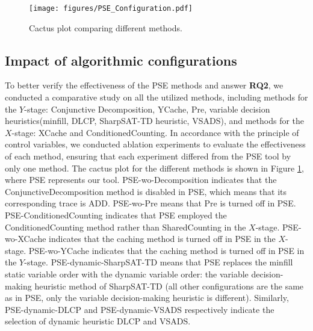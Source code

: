 \begin{figure}[h]
	\centering
	\texttt{[image: figures/PSE\_Configuration.pdf]}
	\caption{Cactus plot comparing different methods.}
	\label{figure:3}
\end{figure} 




\subsection{Impact of algorithmic configurations}
To better verify the effectiveness of the PSE methods and answer \textbf{RQ2}, we conducted a comparative study on all the utilized methods, including methods for the $Y$-stage: \textsf{Conjunctive Decomposition}, \textsf{YCache}, \textsf{Pre}, variable decision heuristics(\textsf{minfill}, \textsf{DLCP}, \textsf{SharpSAT-TD heuristic}, \textsf{VSADS}), and methods for the $X$-stage: \textsf{XCache} and \textsf{ConditionedCounting}.
In accordance with the principle of control variables, we conducted ablation experiments to evaluate the effectiveness of each method, ensuring that each experiment differed from the PSE tool by only one method.
The cactus plot for the different methods is shown in Figure \ref{figure:3}, where PSE represents our tool. 
PSE-wo-Decomposition indicates that the \textsf{ConjunctiveDecomposition} method is disabled in PSE, which means that its corresponding trace is ADD.
PSE-wo-Pre means that \textsf{Pre} is turned off in PSE.
PSE-ConditionedCounting indicates that PSE employed the \textsf{ConditionedCounting} method rather than \textsf{SharedCounting} in the $X$-stage.
PSE-wo-XCache indicates that the caching method is turned off in PSE in the $X$-stage. 
PSE-wo-YCache indicates that the caching method is turned off in PSE in the $Y$-stage.
PSE-dynamic-SharpSAT-TD means that PSE replaces the \textsf{minfill} static variable order with the dynamic variable order: the variable decision-making heuristic method of SharpSAT-TD (all other configurations are the same as in PSE, only the variable decision-making heuristic is different).
Similarly, PSE-dynamic-DLCP and PSE-dynamic-VSADS respectively indicate the selection of dynamic heuristic \textsf{DLCP} and \textsf{VSADS}.

